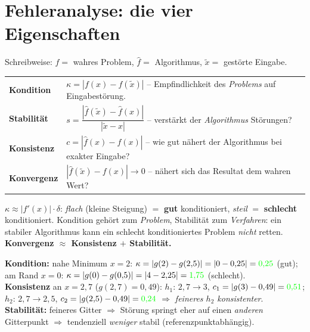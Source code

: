 \documentclass[a4paper,11pt]{article}
\newcommand{\f}[1]{\textcolor{green}{#1}}
\begin{document}
\section{Fehleranalyse: die vier Eigenschaften}
Schreibweise: $f=$ wahres Problem, $\hat f=$ Algorithmus, $\tilde x=$ gestörte Eingabe.

\begin{formel}
\begin{tabular}{@{}ll@{}}
\textbf{Kondition} & $\kappa=|f(x)-f(\tilde x)|$ -- Empfindlichkeit des \emph{Problems} auf Eingabestörung.\\
\textbf{Stabilität} & $s=\dfrac{|\hat f(\tilde x)-\hat f(x)|}{|\tilde x-x|}$ -- verstärkt der \emph{Algorithmus} Störungen?\\
\textbf{Konsistenz} & $c=|\hat f(x)-f(x)|$ -- wie gut nähert der Algorithmus bei exakter Eingabe?\\
\textbf{Konvergenz} & $|\hat f(\tilde x)-f(x)|\to 0$ -- nähert sich das Resultat dem wahren Wert?\\
\end{tabular}
\end{formel}

\begin{merke}[Faustregeln]
$\kappa\approx|f'(x)|\cdot\delta$: \emph{flach} (kleine Steigung) $=$ \textbf{gut} konditioniert,
\emph{steil} $=$ \textbf{schlecht} konditioniert. \;
Kondition gehört zum \emph{Problem}, Stabilität zum \emph{Verfahren}: ein stabiler Algorithmus kann ein
schlecht konditioniertes Problem \emph{nicht} retten. \;
\textbf{Konvergenz $\approx$ Konsistenz $+$ Stabilität.}
\end{merke}

\begin{beispiel}[$g(x)=(x-2)^2$, Störung $\delta=\tfrac12$, Gitter $h_1{=}1$, $h_2{=}\tfrac12$]
\textbf{Kondition:} nahe Minimum $x{=}2$: $\kappa=|g(2)-g(2{,}5)|=|0-0{,}25|=\f{0{,}25}$ (gut);
am Rand $x{=}0$: $\kappa=|g(0)-g(0{,}5)|=|4-2{,}25|=\f{1{,}75}$ (schlecht).\\
\textbf{Konsistenz} an $x{=}2{,}7$ ($g(2{,}7)=0{,}49$): $h_1$: $2{,}7\to3$, $c_1=|g(3)-0{,}49|=\f{0{,}51}$;
$h_2$: $2{,}7\to2{,}5$, $c_2=|g(2{,}5)-0{,}49|=\f{0{,}24}$ $\Rightarrow$ \emph{feineres $h_2$ konsistenter}.\\
\textbf{Stabilität:} feineres Gitter $\Rightarrow$ Störung springt eher auf einen \emph{anderen}
Gitterpunkt $\Rightarrow$ tendenziell \emph{weniger} stabil (referenzpunktabhängig).
\end{beispiel}
\end{document}
